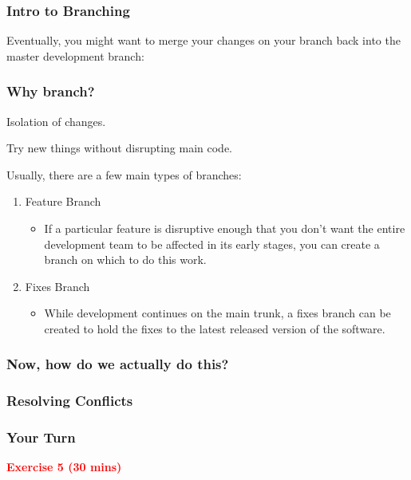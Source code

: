 \documentclass{beamer}
\begin{document}
\begin{frame}
\frametitle{Intro to Branching}
Eventually, you might want to merge your changes on your branch back into the master development branch:
\begin{center}

\end{center}
\end{frame}


\begin{frame}
\frametitle{Why branch?}
\begin{center}
Isolation of changes. \pause
\vspace{15pt}

Try new things without disrupting main code. 
\end{center} \pause

Usually, there are a few main types of branches:
\begin{enumerate}
\item Feature Branch
\begin{itemize}
\item If a particular feature is disruptive enough that you don't want the entire development team to be affected in its early stages, you can create a branch on which to do this work.
\end{itemize}
\item Fixes Branch
\begin{itemize}
\item While development continues on the main trunk, a fixes branch can be created to hold the fixes to the latest released version of the software.
\end{itemize}
\end{enumerate} 
\end{frame}

\begin{frame}
\frametitle{Now, how do we actually do this?}
\end{frame}

\begin{frame}
\frametitle{Resolving Conflicts}
\end{frame}

\begin{frame}
\frametitle{Your Turn}
\begin{center}
\textbf{\textcolor{red}{Exercise 5 (30 mins)}}
\end{center}
\end{frame}
\end{document}
